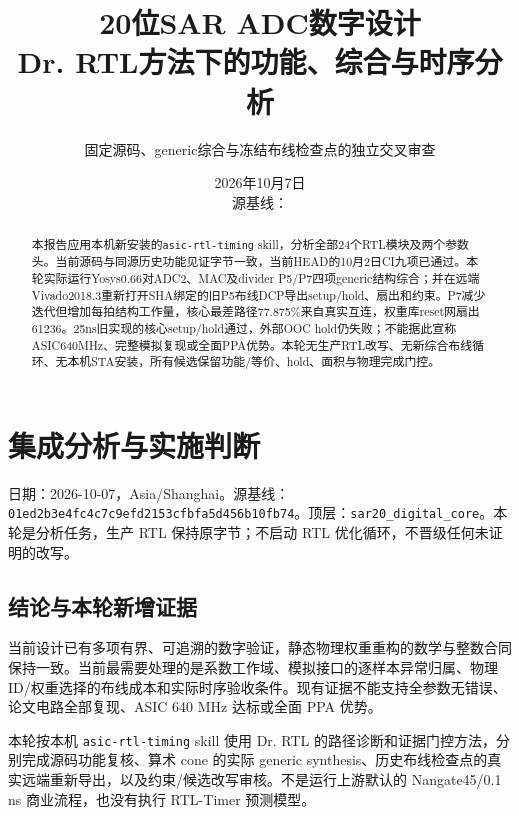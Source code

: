 \documentclass[UTF8,fontset=fandol,10pt,a4paper,openany]{ctexrep}
\title{20位SAR ADC数字设计\\Dr. RTL方法下的功能、综合与时序分析}
\author{固定源码、generic综合与冻结布线检查点的独立交叉审查}
\date{2026年10月7日\\源基线：\code{01ed2b3e4fc4c7c9efd2153cfbfa5d456b10fb74}}
\newcommand{\code}[1]{\nolinkurl{#1}}
\begin{document}
\maketitle
\begin{abstract}
本报告应用本机新安装的\code{asic-rtl-timing} skill，分析全部24个RTL模块及两个参数头。当前源码与同源历史功能见证字节一致，当前HEAD的10月2日CI九项已通过。本轮实际运行Yosys0.66对ADC2、MAC及divider P5/P7四项generic结构综合；并在远端Vivado2018.3重新打开SHA绑定的旧P5布线DCP导出setup/hold、扇出和约束。P7减少迭代但增加每拍结构工作量，核心最差路径77.875\%来自真实互连，权重库reset网扇出61236。25ns旧实现的核心setup/hold通过，外部OOC hold仍失败；不能据此宣称ASIC640MHz、完整模拟复现或全面PPA优势。本轮无生产RTL改写、无新综合布线循环、无本机STA安装，所有候选保留功能/等价、hold、面积与物理完成门控。
\end{abstract}\tableofcontents
\chapter{集成分析与实施判断}



日期：2026-10-07，Asia/Shanghai。源基线：\code{01ed2b3e4fc4c7c9efd2153cfbfa5d456b10fb74}。顶层：\code{sar20_digital_core}。本轮是分析任务，生产 RTL 保持原字节；不启动 RTL 优化循环，不晋级任何未证明的改写。


\section{结论与本轮新增证据}


当前设计已有多项有界、可追溯的数字验证，静态物理权重重构的数学与整数合同保持一致。当前最需要处理的是系数工作域、模拟接口的逐样本异常归属、物理 ID/权重选择的布线成本和实际时序验收条件。现有证据不能支持全参数无错误、论文电路全部复现、ASIC 640 MHz 达标或全面 PPA 优势。


本轮按本机 \code{asic-rtl-timing} skill 使用 Dr. RTL 的路径诊断和证据门控方法，分别完成源码功能复核、算术 cone 的实际 generic synthesis、历史布线检查点的真实远端重新导出，以及约束/候选改写审核。不是运行上游默认的 Nangate45/0.1 ns 商业流程，也没有执行 RTL-Timer 预测模型。
\end{document}
